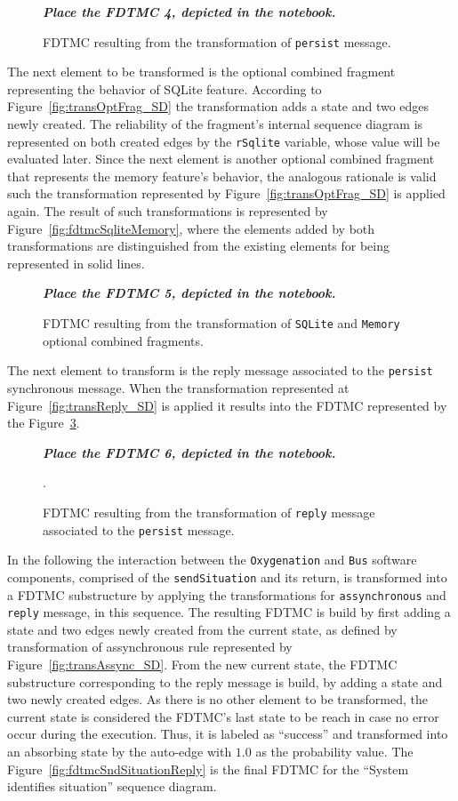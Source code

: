 \begin{figure} 
	\textbf{\textit{Place the FDTMC 4, depicted in the notebook.}}
	\caption{FDTMC resulting from the transformation of \texttt{persist}
	message.} 
	\label{fig:fdtmcPersistSync}
\end{figure}

The next element to be transformed is the optional combined fragment
representing the behavior of SQLite feature. According to
Figure~\ref{fig:transOptFrag_SD} the transformation adds a state and two edges
newly created. The reliability of the fragment's internal sequence diagram is
represented on both created edges by the \texttt{rSqlite} variable, whose value
will be evaluated later. Since the next element is another optional combined
fragment that represents the memory feature's behavior, the analogous rationale
is valid such the transformation represented by Figure~\ref{fig:transOptFrag_SD}
is applied again. The result of such transformations is represented by
Figure~\ref{fig:fdtmcSqliteMemory}, where the elements added by both
transformations are distinguished from the existing elements for being
represented in solid lines.

\begin{figure} 
	\textbf{\textit{Place the FDTMC 5, depicted in the notebook.}}
	\caption{FDTMC resulting from the transformation of \texttt{SQLite} and
	\texttt{Memory} optional combined fragments.}
	\label{fig:fdtmcPersistSync}
\end{figure}

The next element to transform is the reply message associated to the
\texttt{persist}
synchronous message. When the transformation represented at
Figure~\ref{fig:transReply_SD} is applied it results into the FDTMC represented
by the Figure~\ref{fig:fdtmcReplyPersist}.

\begin{figure} 
	\textbf{\textit{Place the FDTMC 6, depicted in the notebook.}}
	\caption{FDTMC resulting from the transformation of \texttt{reply}
	message associated to the \texttt{persist} message.}
	\label{fig:fdtmcReplyPersist}.
\end{figure}

In the following the interaction between the \texttt{Oxygenation} and
\texttt{Bus} software components, comprised of the \texttt{sendSituation} and its return,
is transformed into a FDTMC substructure by applying the transformations for
\texttt{assynchronous} and \texttt{reply} message, in this sequence. The
resulting FDTMC is build by first adding a state and two edges newly created
from the current state, as defined by transformation of assynchronous rule
represented by Figure~\ref{fig:transAssync_SD}. From the new current state, the
FDTMC substructure corresponding to the reply message is build, by adding a
state and two newly created edges. As there is no other element to be
transformed, the current state is considered the FDTMC's last state to be reach
in case no error occur during the execution. Thus, it is labeled as ``success''
and transformed into an absorbing state by the auto-edge with $1.0$ as the
probability value. The Figure~\ref{fig:fdtmcSndSituationReply} is the final
FDTMC for the ``System identifies situation'' sequence diagram. 

